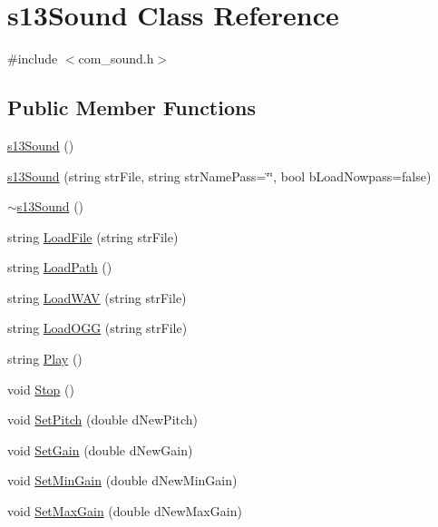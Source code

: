 \hypertarget{classs13_sound}{\section{s13\-Sound Class Reference}
\label{classs13_sound}
}


{\ttfamily \#include $<$com\-\_\-sound.\-h$>$}

\subsection*{Public Member Functions}
\begin{DoxyCompactItemize}
\item 
\hyperlink{classs13_sound_adf8c480e377e17ea990c164cc2df90fb}{s13\-Sound} ()
\item 
\hyperlink{classs13_sound_a20be7c535b5ffb262a4b0af624ffac37}{s13\-Sound} (string str\-File, string str\-Name\-Pass=\char`\"{}\char`\"{}, bool b\-Load\-Nowpass=false)
\item 
\hyperlink{classs13_sound_ae51c02e6d5e1af28633bf1740c0c5738}{$\sim$s13\-Sound} ()
\item 
string \hyperlink{classs13_sound_a0b82e6ee43e11213da330791b63c0a35}{Load\-File} (string str\-File)
\item 
string \hyperlink{classs13_sound_a18e8c48828d76ef8f839a060476ee0ff}{Load\-Path} ()
\item 
string \hyperlink{classs13_sound_a5cc85fa632139c291ab33f4ff93249e7}{Load\-W\-A\-V} (string str\-File)
\item 
string \hyperlink{classs13_sound_a069b18598a75fdc8a1dcefbce02ed269}{Load\-O\-G\-G} (string str\-File)
\item 
string \hyperlink{classs13_sound_aa49718c221e6e9f82810993df29cf7f9}{Play} ()
\item 
void \hyperlink{classs13_sound_a6da45c60ab6824020be7b2c3e30d4af7}{Stop} ()
\item 
void \hyperlink{classs13_sound_af1f375a14fa2b60d34a86e9fa883829e}{Set\-Pitch} (double d\-New\-Pitch)
\item 
void \hyperlink{classs13_sound_afbc0700acd4483c9c401d84b57f93fce}{Set\-Gain} (double d\-New\-Gain)
\item 
void \hyperlink{classs13_sound_a3b9ec1ce9bce8d6f6384735de644c7bf}{Set\-Min\-Gain} (double d\-New\-Min\-Gain)
\item 
void \hyperlink{classs13_sound_afe18ba1884c769de33b5377b9942c813}{Set\-Max\-Gain} (double d\-New\-Max\-Gain)
\item 

\end{DoxyCompactItemize}
